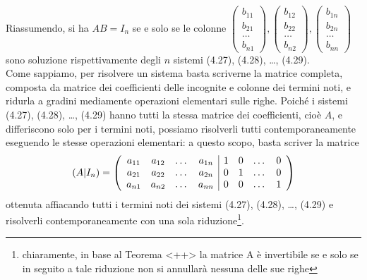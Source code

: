 \documentclass{book}
\begin{document}
Riassumendo, si ha $AB=I_n$ se e solo se le colonne $
\begin{pmatrix}
  b_{11}\\
  b_{21}\\
  \dots\\
  b_{n1}
\end{pmatrix},
\begin{pmatrix}
  b_{12}\\
  b_{22}\\
  \dots\\
  b_{n2}
\end{pmatrix},
\begin{pmatrix}
  b_{1n}\\
  b_{2n}\\
  \dots\\
  b_{nn}
\end{pmatrix}
$ sono soluzione rispettivamente degli $n$ sistemi (4.27), (4.28), \dots, (4.29).\\
Come sappiamo, per risolvere un sistema basta scriverne la matrice completa, composta da matrice dei
coefficienti delle incognite e colonne dei termini noti, e ridurla a gradini mediamente operazioni elementari
sulle righe. Poiché i sistemi (4.27), (4.28), \dots, (4.29) hanno tutti la stessa matrice dei coefficienti, cioè
$A$, e differiscono solo per i termini noti, possiamo risolverli tutti contemporaneamente eseguendo le stesse
operazioni elementari: a questo scopo, basta scriver la matrice
\begin{equation}
  \label{eq:4.30}
  (A|I_n)=\left(
    \begin{array}[center]{cccc|cccc}
      a_{11} & a_{12} & \dots & a_{1n} & 1 & 0 & \dots &0\\
      a_{21} & a_{22} & \dots & a_{2n} & 0 & 1 & \dots &0\\
      a_{n1} & a_{n2} & \dots & a_{nn} & 0 & 0 & \dots &1 
    \end{array}
    \right)
\end{equation}
ottenuta affiacando tutti i termini noti dei sistemi (4.27), (4.28), \dots, (4.29) e risolverli
contemporaneamente con una sola riduzione\footnote{chiaramente, in base al Teorema <++> la matrice A è
  invertibile se e solo se in seguito a tale riduzione non si annullarà nessuna delle sue righe}.
\end{document}
